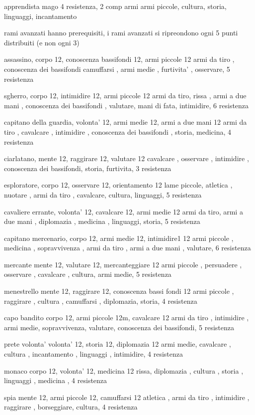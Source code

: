 \documentclass[12pt,a4paper,twoside,openany]{book}
\begin{document}
apprendista mago  4 resistenza, 2 comp armi
armi piccole, cultura,  storia, linguaggi, incantamento


rami avanzati hanno prerequisiti, i rami avanzati si ripreondono ogni 5 punti distribuiti (e non ogni 3)


assassino, corpo 12, conoscenza bassifondi 12, armi piccole 12
armi da tiro , conoscenza dei bassifondi  camuffarsi , armi medie , furtivita' , osservare, 5 resistenza

sgherro, corpo 12, intimidire 12, armi piccole 12
armi da tiro, rissa , armi a due mani , conoscenza dei bassifondi , valutare, mani  di fata, intimidire,  6 resistenza

capitano della guardia, volonta' 12, armi medie 12, armi a due mani 12
armi da tiro , cavalcare , intimidire , conoscenza dei bassifondi , storia, medicina, 4 resistenza

ciarlatano, mente 12, raggirare 12, valutare 12
cavalcare , osservare ,  intimidire , conoscenza dei bassifondi, storia, furtivita,  3 resistenza

esploratore, corpo 12, osservare 12, orientamento 12
lame piccole, atletica ,  nuotare , armi da tiro ,  cavalcare, cultura,  linguaggi,  5 resistenza

cavaliere errante, volonta' 12, cavalcare 12, armi medie 12
armi da tiro, armi a due mani , diplomazia , medicina , linguaggi, storia,  5 resistenza

capitano mercenario, corpo 12, armi medie 12, intimidire1 12
armi piccole , medicina , sopravvivenza , armi da tiro , armi a due mani , valutare,  6 resistenza

mercante mente 12, valutare 12, mercanteggiare 12
armi piccole , persuadere  ,  osservare , cavalcare , cultura, armi medie,  5 resistenza

menestrello mente 12, raggirare 12, conoscenza bassi fondi 12
armi piccole , raggirare , cultura , camuffarsi , diplomazia, storia,  4 resistenza

capo bandito corpo 12, armi piccole 12m, cavalcare 12
armi da tiro , intimidire , armi medie, sopravvivenza, valutare, conoscenza dei bassifondi, 5 resistenza

prete volonta' volonta' 12, storia 12, diplomazia 12
armi medie, cavalcare ,  cultura , incantamento , linguaggi , intimidire,  4 resistenza

monaco corpo 12, volonta' 12, medicina 12
rissa, diplomazia  , cultura , storia , linguaggi , medicina ,  4 resistenza

spia mente 12, armi piccole 12, camuffarsi 12
atletica , armi da tiro ,  intimidire , raggirare , borseggiare, cultura,  4 resistenza
\end{document}
